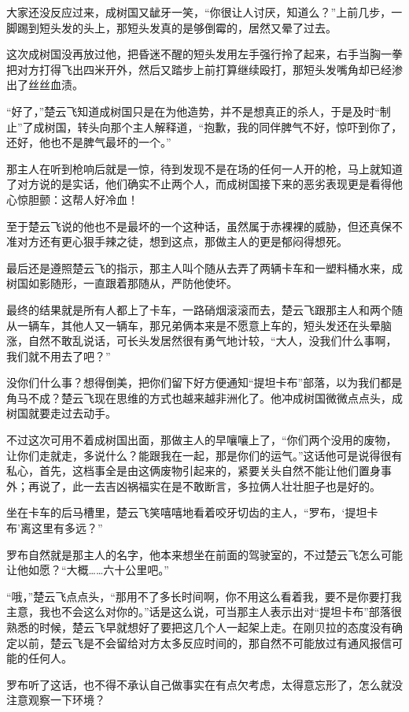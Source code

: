 大家还没反应过来，成树国又龇牙一笑，“你很让人讨厌，知道么？”上前几步，一脚踢到短头发的头上，那短头发真的是够倒霉的，居然又晕了过去。

这次成树国没再放过他，把昏迷不醒的短头发用左手强行拎了起来，右手当胸一拳把对方打得飞出四米开外，然后又踏步上前打算继续殴打，那短头发嘴角却已经渗出了丝丝血渍。

“好了，”楚云飞知道成树国只是在为他造势，并不是想真正的杀人，于是及时“制止”了成树国，转头向那个主人解释道，“抱歉，我的同伴脾气不好，惊吓到你了，还好，他也不是脾气最坏的一个。”

那主人在听到枪响后就是一惊，待到发现不是在场的任何一人开的枪，马上就知道了对方说的是实话，他们确实不止两个人，而成树国接下来的恶劣表现更是看得他心惊胆颤：这帮人好冷血！

至于楚云飞说的他也不是最坏的一个这种话，虽然属于赤裸裸的威胁，但还真保不准对方还有更心狠手辣之徒，想到这点，那做主人的更是郁闷得想死。

最后还是遵照楚云飞的指示，那主人叫个随从去弄了两辆卡车和一塑料桶水来，成树国如影随形，一直跟着那随从，严防他使坏。

最终的结果就是所有人都上了卡车，一路硝烟滚滚而去，楚云飞跟那主人和两个随从一辆车，其他人又一辆车，那兄弟俩本来是不愿意上车的，短头发还在头晕脑涨，自然不敢乱说话，可长头发居然很有勇气地计较，“大人，没我们什么事啊，我们就不用去了吧？”

没你们什么事？想得倒美，把你们留下好方便通知“提坦卡布”部落，以为我们都是角马不成？楚云飞现在思维的方式也越来越非洲化了。他冲成树国微微点点头，成树国就要走过去动手。

不过这次可用不着成树国出面，那做主人的早嚷嚷上了，“你们两个没用的废物，让你们走就走，多说什么？能跟我在一起，那是你们的运气。”这话他可是说得很有私心，首先，这档事全是由这俩废物引起来的，紧要关头自然不能让他们置身事外；再说了，此一去吉凶祸福实在是不敢断言，多拉俩人壮壮胆子也是好的。

坐在卡车的后马槽里，楚云飞笑嘻嘻地看着咬牙切齿的主人，“罗布，‘提坦卡布’离这里有多远？”

罗布自然就是那主人的名字，他本来想坐在前面的驾驶室的，不过楚云飞怎么可能让他如愿？“大概……六十公里吧。”

“哦，”楚云飞点点头，“那用不了多长时间啊，你不用这么看着我，要不是你要打我主意，我也不会这么对你的。”话是这么说，可当那主人表示出对“提坦卡布”部落很熟悉的时候，楚云飞早就想好了要把这几个人一起架上走。在刚贝拉的态度没有确定以前，楚云飞是不会留给对方太多反应时间的，那自然不可能放过有通风报信可能的任何人。

罗布听了这话，也不得不承认自己做事实在有点欠考虑，太得意忘形了，怎么就没注意观察一下环境？

